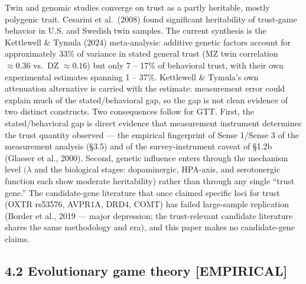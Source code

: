 \documentclass[
]{article}
\begin{document}
Twin and genomic studies converge on trust as a partly heritable, mostly
polygenic trait. Cesarini et al.~(2008) found significant heritability
of trust-game behavior in U.S. and Swedish twin samples. The current
synthesis is the Kettlewell \& Tymula (2024) meta-analysis: additive
genetic factors account for approximately 33\% of variance in stated
general trust (MZ twin correlation \(\approx 0.36\) vs.~DZ
\(\approx 0.16\)) but only 7 -- 17\% of behavioral trust, with their own
experimental estimates spanning 1 -- 37\%. Kettlewell \& Tymula's own
attenuation alternative is carried with the estimate: measurement error
could explain much of the stated/behavioral gap, so the gap is not clean
evidence of two distinct constructs. Two consequences follow for GTT.
First, the stated/behavioral gap is direct evidence that measurement
instrument determines the trust quantity observed --- the empirical
fingerprint of Sense 1/Sense 3 of the measurement analysis (§3.5) and of
the survey-instrument caveat of §1.2b (Glaeser et al., 2000). Second,
genetic influence enters through the mechanism level \((\lambda\) and
the biological stages: dopaminergic, HPA-axis, and serotonergic function
each show moderate heritability) rather than through any single ``trust
gene.'' The candidate-gene literature that once claimed specific loci
for trust (OXTR rs53576, AVPR1A, DRD4, COMT) has failed large-sample
replication (Border et al., 2019 --- major depression; the
trust-relevant candidate literature shares the same methodology and
era), and this paper makes no candidate-gene claims.

\subsection{4.2 Evolutionary game theory
{[}EMPIRICAL{]}}\label{evolutionary-game-theory-empirical}
\end{document}
